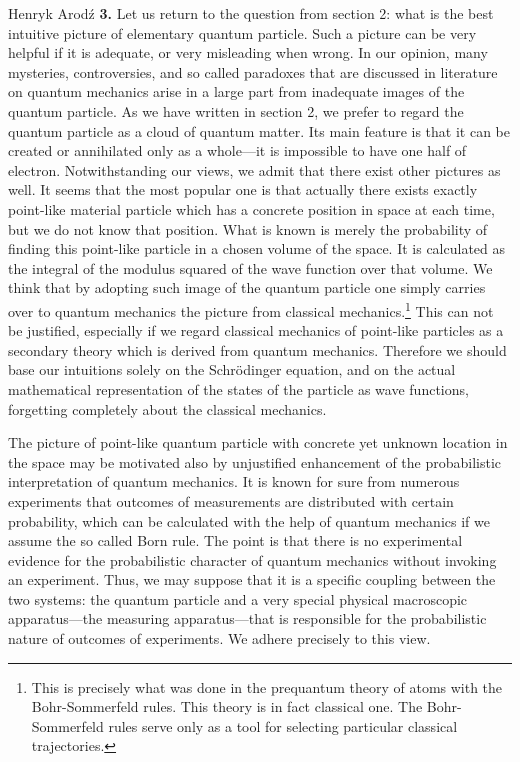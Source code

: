\begin{artengenv}{Henryk Arod\'z}
{\bf 3.} Let us return to the question from section 2: what is the best intuitive picture of elementary quantum particle. Such a picture can be very helpful if it is adequate, or very misleading when wrong. In our opinion, many mysteries, controversies, and so called paradoxes that are discussed in literature on quantum mechanics arise in a large part from inadequate images of the quantum particle. As we have written in section 2, we prefer to regard
 the quantum particle as a cloud of quantum matter. Its main feature is that it can be created or annihilated only as a whole---it is impossible to have one half of electron. Notwithstanding our views, we admit that there exist other pictures as well. It seems that the most popular one is that actually there exists exactly point-like material particle which has a concrete position in space at each time, but we do not know that position. What is known is merely the probability of finding this point-like particle in a chosen volume of the space. It is calculated as the integral of the modulus squared of the wave function over that volume. We think that by adopting such image of the quantum particle one simply carries over to quantum mechanics the picture from classical mechanics.\footnote{This is precisely what was done in the prequantum theory of atoms with the Bohr-Sommerfeld rules. This theory is in fact classical one. The Bohr-Sommerfeld rules serve only as a tool for selecting particular classical trajectories.} This can not be justified, especially if we regard classical mechanics of point-like particles as a secondary theory which is derived from quantum mechanics. Therefore we should base our intuitions solely on the Schr\"odinger equation, and on the actual mathematical representation of the states of the particle as wave functions, forgetting completely about the classical mechanics. 

The picture of point-like quantum particle with concrete yet unknown location in the space may be motivated also by unjustified enhancement of the probabilistic interpretation of quantum mechanics. It is known for sure from numerous experiments that outcomes of measurements are distributed with certain probability, which can be calculated with the help of quantum mechanics if we assume the so called Born rule. The point is that there is no experimental evidence for the probabilistic character of quantum mechanics without invoking an experiment. Thus, we may suppose that it is a specific coupling between the two systems: the quantum particle and a very special physical macroscopic apparatus---the measuring apparatus---that is responsible for the probabilistic nature of outcomes of experiments. We adhere precisely to this view. 


\end{artengenv}
